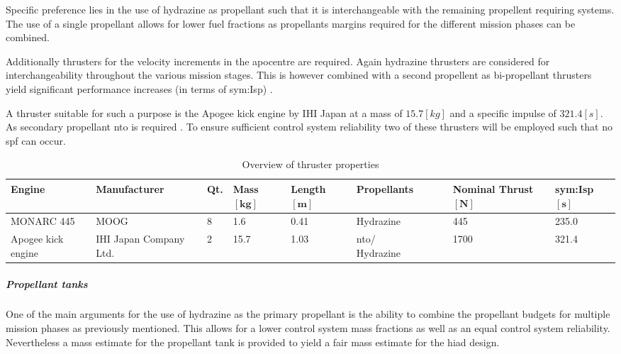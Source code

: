 Specific preference lies in the use of hydrazine as propellant such that it is interchangeable with the remaining propellent requiring systems. The use of a single propellant allows for lower fuel fractions as propellants margins required for the different mission phases can be combined.

Additionally thrusters for the velocity increments in the apocentre are required. Again hydrazine thrusters are considered for interchangeability throughout the various mission stages. This is however combined with a second propellent as bi-propellant thrusters yield significant performance increases (in terms of \gls{sym:Isp}) \cite{Wertz2011}. 

A thruster suitable for such a purpose is the Apogee kick engine by IHI Japan at a mass of $15.7 \left[kg\right]$ and a specific impulse of $321.4 \left[s\right]$. As secondary propellant \gls{nto} is required \cite[p.538]{Wertz2011}. To ensure sufficient control system reliability two of these thrusters will be employed such that no \gls{spf} can occur.  %


\begin{table}[h]
	\centering
\caption[Overview of thruster properties]{Overview of thruster properties \cite[p.538]{Wertz2011}}
\label{tab:thrusters}
\hspace{-5mm}
\begin{tabular}{|p{}|p{}|p{}|p{}|p{}|p{}|p{}|l|} \hline 
\textbf{Engine    }          &\textbf{ Manufacturer }         & \textbf{Qt.} &\textbf{Mass $\mathbf{[kg]}$}      & \textbf{Length $\mathbf{[m]}$} & \textbf{Propellants}  & \textbf{Nominal Thrust $\mathbf{[N]}$} & \textbf{\gls{sym:Isp} $\mathbf{[s]}$} \\ \hline \hline
MONARC 445          & MOOG                  & 8        & 1.6  & 0.41 & Hydrazine     & 445         & 235.0    \\ \hline
Apogee kick engine & IHI Japan Company Ltd. & 2        & 15.7 & 1.03 & \gls{nto}/ ~~~~~ Hydrazine & 1700        & 321.4    \\ \hline
\end{tabular}
\end{table}


\subparagraph{Propellant tanks}
One of the main arguments for the use of hydrazine as the primary propellant is the ability to combine the propellant budgets for multiple mission phases as previously mentioned. This allows for a lower control system mass fractions as well as an equal control system reliability. Nevertheless a mass estimate for the propellant tank is provided to yield a fair mass estimate for the \gls{hiad} design. 

